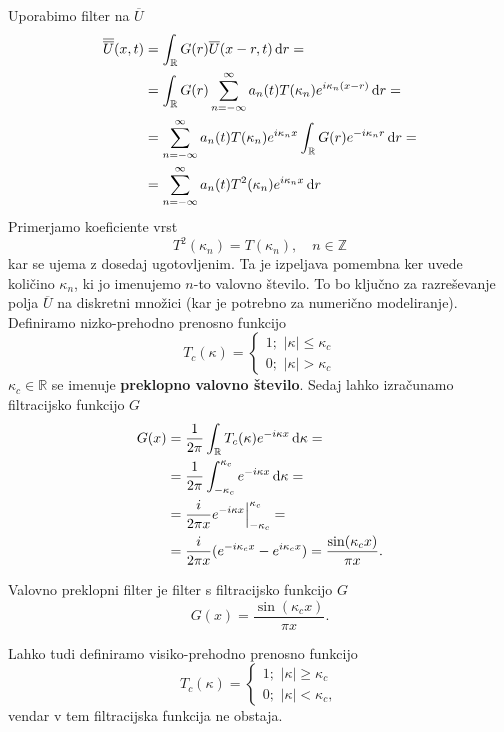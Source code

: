 \documentclass[mat2, tisk]{fmfdelo}
\newcommand{\R}{\mathbb R}
\newcommand{\Z}{\mathbb Z}
\begin{document}
\noindent
Uporabimo filter na $\overline{U}$
\begin{align*}
\overline{\overline{U}}(x, t) &= \int_\R G(r) \overline{U}(x-r, t) \dif r = \\
&= \int_\R G(r) \sum_{n=-\infty}^\infty a_n(t) T(\kappa_n) e^{i\kappa_n (x - r)} \dif r= \\
&= \sum_{n=-\infty}^\infty a_n(t)T(\kappa_n) e^{i\kappa_n x} \int_\R G(r)e^{-i\kappa_n r} \dif r = \\
&= \sum_{n=-\infty}^\infty a_n(t)T^2(\kappa_n) e^{i\kappa_n x} \dif r
\end{align*}
Primerjamo koeficiente vrst
$$
T^2(\kappa_n) = T(\kappa_n), \quad n\in \Z
$$
kar se ujema z dosedaj ugotovljenim. Ta je izpeljava pomembna ker uvede količino 
$\kappa_n$, ki jo imenujemo $n$-to valovno število. To bo ključno za razreševanje 
polja $\overline{U}$ na diskretni množici (kar je potrebno za numerično modeliranje).
Definiramo nizko-prehodno prenosno funkcijo
$$
T_c(\kappa)=\left\{\begin{array}{l}
  1 ;\,\, |\kappa| \leq \kappa_c \\
  0 ;\,\, |\kappa| > \kappa_c
\end{array}\right.
$$
$\kappa_c \in \R$ se imenuje \textbf{preklopno valovno število}. Sedaj lahko izračunamo 
filtracijsko funkcijo $G$
\begin{align*}
G(x) &= \frac{1}{2\pi} \int_\R T_c(\kappa) e^{-i\kappa x} \dif \kappa = \\
&= \frac{1}{2\pi} \int_{-\kappa_c}^{\kappa_c} e^{-i\kappa x} \dif \kappa = \\ 
&= \frac{i}{2\pi x} e^{-i\kappa x}\Big|_{-\kappa_c}^{\kappa_c} = \\
&= \frac{i}{2\pi x} (e^{-i\kappa_c x} - e^{i\kappa_c x}) = \frac{\sin(\kappa_c x)}{\pi x}.
\end{align*} 

\begin{definicija}
Valovno preklopni filter je filter s filtracijsko funkcijo $G$
\begin{equation}
G(x) = \frac{\sin(\kappa_c x)}{\pi x}.
\end{equation}
\end{definicija}

\begin{opomba}
Lahko tudi definiramo visiko-prehodno prenosno funkcijo
$$
T_c(\kappa)=\left\{\begin{array}{l}
  1 ;\,\, |\kappa| \geq \kappa_c \\
  0 ;\,\, |\kappa| < \kappa_c,
\end{array}\right.
$$
vendar v tem filtracijska funkcija ne obstaja.
\end{opomba}
\end{document}
